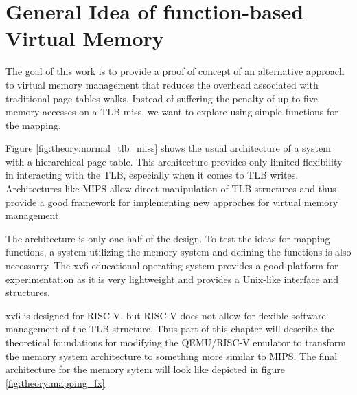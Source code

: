 


\section{General Idea of function-based Virtual Memory}


The goal of this work is to provide a proof of concept of an alternative approach
to virtual memory management that reduces the overhead associated with traditional page tables walks.
Instead of suffering the penalty of up to five memory accesses on a TLB miss,
we want to explore using simple functions for the mapping.

Figure \ref{fig:theory:normal_tlb_miss} shows the usual architecture of a system
with a hierarchical page table.
This architecture provides only limited flexibility in interacting with the TLB, especially when it comes to TLB writes.
Architectures like MIPS allow direct manipulation of TLB structures and thus provide a good framework for implementing new approches for virtual memory management.

The architecture is only one half of the design. To test the ideas for mapping
functions, a system utilizing the memory system and defining the functions is also necessarry.
The xv6 educational operating system provides a good platform for experimentation as it is very lightweight and provides a Unix-like interface and structures.

xv6 is designed for RISC-V, but RISC-V does not allow for flexible software-management of the TLB structure.
Thus part of this chapter will describe the theoretical foundations for modifying
the QEMU/RISC-V emulator to transform the memory system architecture to something
more similar to MIPS.
The final architecture for the memory sytem will look like depicted in figure \ref{fig:theory:mapping_fx}

